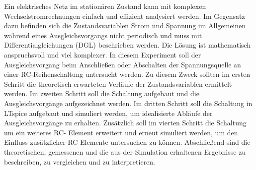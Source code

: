 %
Ein elektrisches Netz im stationären Zustand kann mit komplexen Wechselstromrechnungen einfach und effizient analysiert
werden. Im Gegensatz dazu befinden sich die Zustandsvariablen Strom und Spannung im Allgemeinen während eines
Ausgleichsvorgangs 
nicht periodisch und muss mit Differentialgleichungen (DGL) beschrieben werden. Die Lösung ist
mathematisch anspruchsvoll und viel komplexer. In diesem Experiment soll der Ausgleichsvorgang beim Anschließen oder
Abschalten der Spannungsquelle an einer RC-Reihenschaltung untersucht werden. Zu diesem Zweck sollten im ersten Schritt die
theoretisch erwarteten Verläufe der Zustandsvariablen ermittelt werden. Im zweiten Schritt soll die Schaltung aufgebaut und die
Ausgleichsvorgänge aufgezeichnet werden. Im dritten Schritt soll die Schaltung in LTspice aufgebaut und simuliert werden, um
idealisierte Abläufe der Ausgleichsvorgänge zu erhalten. Zusätzlich soll im vierten Schritt die Schaltung um ein weiteres RC-
Element erweitert und erneut simuliert werden, um den Einfluss zusätzlicher RC-Elemente untersuchen zu können. Abschließend
sind die theoretischen, gemessenen und die aus der Simulation erhaltenen Ergebnisse zu beschreiben, zu vergleichen und zu
interpretieren.
%
%
%
\begin{flushright}
  \textit{\autorA}
\end{flushright}
%
%
%